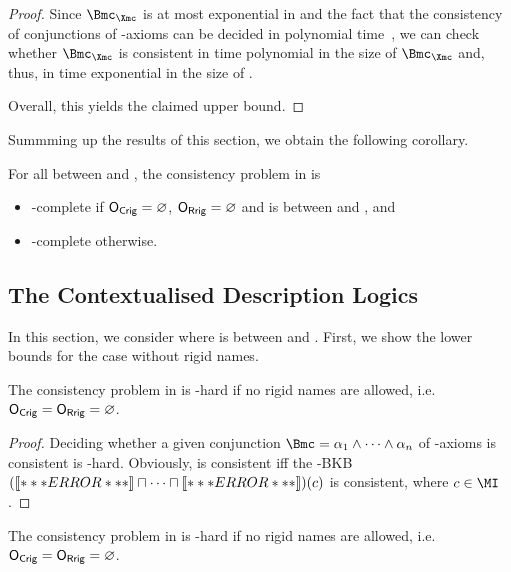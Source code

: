 \begin{proof}
    \noindent Since $\Bmc_{\Xmc}$ is at most exponential in \Bmc and the fact that the consistency
    of conjunctions of \ELObot-axioms can be decided in polynomial time~\cite{BaBL-IJCAI05}, we can
    check whether $\Bmc_{\Xmc}$ is consistent in time polynomial in the size of $\Bmc_{\Xmc}$ and,
    thus, in time exponential in the size of \B.

    Overall, this yields the claimed upper bound.
\end{proof}

Summming up the results of this section, we obtain the following corollary.

\begin{corollary}
  For all \LM between \ALC and \SHOIQ, the consistency problem in \LMEL is
  \begin{itemize}
  \item \ExpTime-complete if $\OCR=\emptyset$, $\ORR=\emptyset$ and \LM is between \ALC and \SHOQ,
    and
  \item \NExpTime-complete otherwise.
  \end{itemize}
\end{corollary}

\subsection{The Contextualised Description Logics \texorpdfstring{\ELLO}{EL[LO]}}
\label{sec:dlouter-el}

In this section, we consider \ELLO where \LO is between \ALC and \SHOQ.
%
First, we show the lower bounds for the case without rigid names.

\begin{theorem}\label{thm:elalc-exp-hard-no-rigid}
  The consistency problem in \ELALC is \ExpTime-hard if no rigid names are allowed, i.e.\ $\OCR = \ORR = \emptyset$.
\end{theorem}

\begin{proof}
  Deciding whether a given conjunction $\B = \alpha_{1} \land \dots \land \alpha_{n}$ of \ALC-axioms
  is consistent is \ExpTime-hard\cite{Sch-IJCAI91}.  Obviously, \B is consistent iff the \ELALC-BKB
  $(\oax{\alpha_{1}} \sqcap \dots \sqcap \oax{\alpha_{n}})(c)$ is consistent, where $c\in\MI$.
\end{proof}

\begin{theorem}\label{thm:elshoiq-lower-no-rigid}
  The consistency problem in \ELSHOIQ is \NExpTime-hard if no rigid names are allowed, i.e.\ $\OCR = \ORR = \emptyset$.
\end{theorem}

